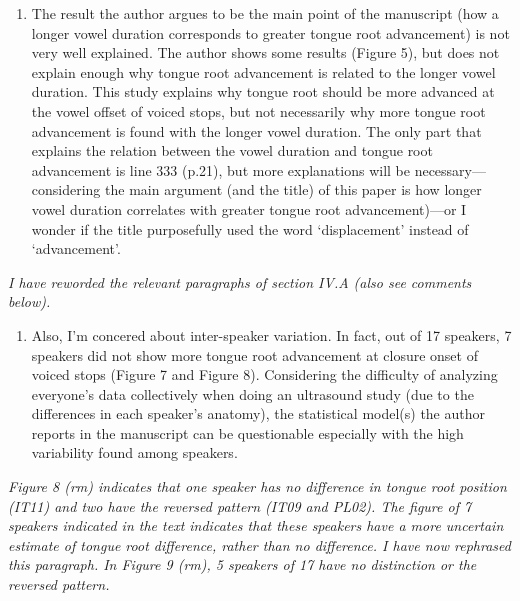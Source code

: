 \documentclass[]{article}
\providecommand{\tightlist}{%
  \setlength{\itemsep}{0pt}\setlength{\parskip}{0pt}}
\begin{document}
\begin{enumerate}
\def\labelenumi{\arabic{enumi}.}
\tightlist
\item
  The result the author argues to be the main point of the manuscript
  (how a longer vowel duration corresponds to greater tongue root
  advancement) is not very well explained. The author shows some results
  (Figure 5), but does not explain enough why tongue root advancement is
  related to the longer vowel duration. This study explains why tongue
  root should be more advanced at the vowel offset of voiced stops, but
  not necessarily why more tongue root advancement is found with the
  longer vowel duration. The only part that explains the relation
  between the vowel duration and tongue root advancement is line 333
  (p.21), but more explanations will be necessary---considering the main
  argument (and the title) of this paper is how longer vowel duration
  correlates with greater tongue root advancement)---or I wonder if the
  title purposefully used the word `displacement' instead of
  `advancement'.
\end{enumerate}

\begin{adjustwidth}{1cm}{} \textit{
I have reworded the relevant paragraphs of section IV.A (also see comments below).
} \end{adjustwidth}

\begin{enumerate}
\def\labelenumi{\arabic{enumi}.}
\setcounter{enumi}{1}
\tightlist
\item
  Also, I'm concered about inter-speaker variation. In fact, out of 17
  speakers, 7 speakers did not show more tongue root advancement at
  closure onset of voiced stops (Figure 7 and Figure 8). Considering the
  difficulty of analyzing everyone's data collectively when doing an
  ultrasound study (due to the differences in each speaker's anatomy),
  the statistical model(s) the author reports in the manuscript can be
  questionable especially with the high variability found among
  speakers.
\end{enumerate}

\begin{adjustwidth}{1cm}{} \textit{
Figure 8 (rm) indicates that one speaker has no difference in tongue root position (IT11) and two have the reversed pattern (IT09 and PL02). The figure of 7 speakers indicated in the text indicates that these speakers have a more uncertain estimate of tongue root difference, rather than no difference. I have now rephrased this paragraph. In Figure 9 (rm), 5 speakers of 17 have no distinction or the reversed pattern.
} \end{adjustwidth}
\end{document}

